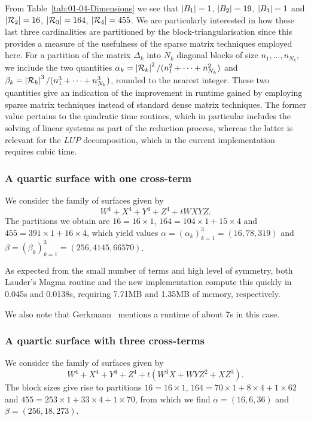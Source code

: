From Table~\ref{tab:01-04-Dimensions} we see that $\left\lvert B_1\right\rvert = 1$, 
$\left\lvert B_2\right\rvert = 19$, $\left\lvert B_3\right\rvert = 1$ and $\left\lvert\mathcal{R}_2\right\rvert = 16$, 
$\left\lvert\mathcal{R}_3\right\rvert = 164$, $\left\lvert\mathcal{R}_4\right\rvert = 455$.  We are particularly interested in 
how these last three cardinalities are partitioned by the 
block-triangularisation since this provides a measure of the usefulness of the 
sparse matrix techniques employed here.  For a partition of the matrix 
$\Delta_k$ into $N_k$ diagonal blocks of size $n_1, \dotsc, n_{N_k}$, we 
include the two quantities 
$\alpha_k = \left\lvert\mathcal{R}_k\right\rvert^2 / (n_1^2 + \dotsb + n_{N_k}^2)$ and 
$\beta_k = \left\lvert\mathcal{R}_k\right\rvert^3 / (n_1^3 + \dotsb + n_{N_k}^3)$, rounded to the 
nearest integer.  These two quantities give an indication of the improvement 
in runtime gained by employing sparse matrix techniques instead of standard 
dense matrix techniques.  The former value pertains to the quadratic time 
routines, which in particular includes the solving of linear systems as part 
of the reduction process, whereas the latter is relevant for the $LUP$ 
decomposition, which in the current implementation requires cubic time.

\subsubsection{A quartic surface with one cross-term}

We consider the family of surfaces given by 
\begin{equation*}
W^4 + X^4 + Y^4 + Z^4 + t W X Y Z.
\end{equation*}
The partitions we obtain are $16 = 16 \times 1$, 
$164 = 104 \times 1 + 15 \times 4$ and $455 = 391 \times 1 + 16 \times 4$, 
which yield values $\alpha = (\alpha_k)_{k=1}^3 = (16,78,319)$ and 
$\beta = (\beta_k)_{k=1}^3 = (256,4145,66570)$.

As expected from the small number of terms and high level of symmetry, both 
Lauder's {\sc Magma} routine and the new implementation compute this quickly 
in 0.045s and 0.0138s, requiring 7.71MB and 1.35MB of memory, respectively.

We also note that Gerkmann~\citep[\S 7.5]{Gerkmann2007} mentions a runtime of 
about 7s in this case.

\subsubsection{A quartic surface with three cross-terms}

We consider the family of surfaces given by 
\begin{equation*}
W^4 + X^4 + Y^4 + Z^4 + t (W^3 X + W Y Z^2 + X Z^3).
\end{equation*}
The block sizes give rise to partitions $16 = 16 \times 1$, 
$164 = 70 \times 1 + 8 \times 4 + 1 \times 62$ and 
$455 = 253 \times 1 + 33 \times 4 + 1 \times 70$, from which we find 
$\alpha = (16,6,36)$ and $\beta = (256,18,273)$.

